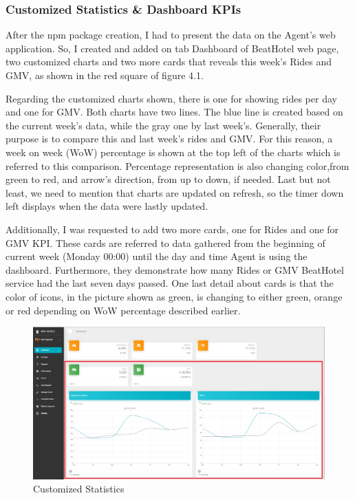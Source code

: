 \subsubsection{Customized Statistics \& Dashboard KPIs}
After the npm package creation, I had to present the data on the Agent's web application. So, I created and added on tab Dashboard of BeatHotel web page, two customized charts and two more cards that reveals this week's Rides and GMV, as shown in the red square of figure 4.1.   \par
Regarding the customized charts shown, there is one for showing rides per day and one for GMV. Both charts have two lines. The blue line is created based on the current week's data, while the gray one by last week's. Generally, their purpose is to compare this and last week's rides and GMV. For this reason, a week on week (WoW) percentage is shown at the top left of the charts which is referred to this comparison. Percentage representation is also changing color,from green to red, and arrow's direction, from up to down, if needed. Last but not least, we need to mention that charts are updated on refresh, so the timer down left displays when the data were lastly updated. \par 
Additionally, I was requested to add two more cards, one for Rides and one for GMV KPI. These cards are referred to data gathered from the beginning of current week (Monday 00:00) until the day and time Agent is using the dashboard. Furthermore, they demonstrate how many Rides or GMV BeatHotel service had the last seven days passed. One last detail about cards is that the color of icons, in the picture shown as green, is changing to either green, orange or red depending on WoW percentage described earlier. \par

\begin{figure}[H]
	\begin{center}
		\includegraphics[scale=0.45]{images/my_projects/Statistics/feature-dashboard-statistics.png}
	\end{center}
	\caption{Customized Statistics}
\end{figure}

